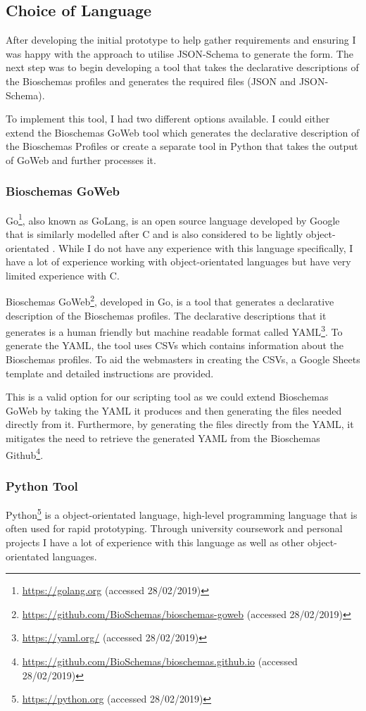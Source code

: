 \subsection{Choice of Language}
After developing the initial prototype to help gather requirements and ensuring I was happy with the approach to utilise JSON-Schema to generate the form. The next step was to begin developing a tool that takes the declarative descriptions of the Bioschemas profiles and generates the required files (JSON and JSON-Schema).

To implement this tool, I had two different options available. I could either extend the Bioschemas GoWeb tool which generates the declarative description of the Bioschemas Profiles or create a separate tool in Python that takes the output of GoWeb and further processes it.

\subsubsection{Bioschemas GoWeb}
Go\footnote{\url{https://golang.org} (accessed 28/02/2019)}, also known as GoLang, is an open source language developed by Google that is similarly modelled after C \cite{goLang} and is also considered to be lightly object-orientated \cite{goObject}. While I do not have any experience with this language specifically, I have a lot of experience working with object-orientated languages but have very limited experience with C. 

Bioschemas GoWeb\footnote{\url{https://github.com/BioSchemas/bioschemas-goweb} (accessed 28/02/2019)}, developed in Go, is a tool that generates a declarative description of the Bioschemas profiles. The declarative descriptions that it generates is a human friendly but machine readable format called YAML\footnote{\url{https://yaml.org/} (accessed 28/02/2019)}. To generate the YAML, the tool uses CSVs which contains information about the Bioschemas profiles. To aid the webmasters in creating the CSVs, a Google Sheets template and detailed instructions are provided.

This is a valid option for our scripting tool as we could extend Bioschemas GoWeb by taking the YAML it produces and then generating the files needed directly from it. Furthermore, by generating the files directly from the YAML, it mitigates the need to retrieve the generated YAML from the Bioschemas Github\footnote{\url{https://github.com/BioSchemas/bioschemas.github.io} (accessed 28/02/2019)}.

\subsubsection{Python Tool}
Python\footnote{\url{https://python.org} (accessed 28/02/2019)} is a object-orientated language, high-level programming language that is often used for rapid prototyping. Through university coursework and personal projects I have a lot of experience with this language as well as other object-orientated languages. 

